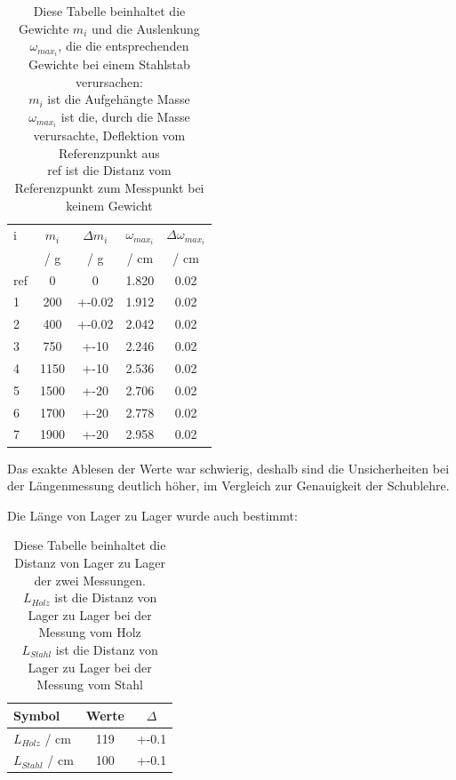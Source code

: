\documentclass[11pt,ngerman]{scrartcl}
\begin{document}
\begin{table}[H]
    \centering
    \caption{
        Diese Tabelle beinhaltet die Gewichte $m_i$ und die Auslenkung $\omega_{max_{i}}$,
        die die entsprechenden Gewichte bei einem Stahlstab verursachen:\\
        $m_{i}$ ist die Aufgehängte Masse \\
        $\omega_{max_{i}}$ ist die, durch die Masse verursachte, Deflektion vom Referenzpunkt aus \\
        ref ist die Distanz vom Referenzpunkt zum Messpunkt bei keinem Gewicht \\
    }
    \label{tab:messwerte_stahl}
    \begin{tabular}{l|S|S|S|S}
        i   & {$m_i$}     & {$\Delta m_i$} & $\omega_{max_{i}}$ & $\Delta \omega_{max_{i}}$ \\
        {}  & {/ \si{\g}} & {/ \si{\g}}    & {/ \si{\cm}}       & {/ \si{\cm}} \\ \hline \hline
        ref & 0    & 0      & 1.820 & 0.02\\
        1   & 200  & +-0.02 & 1.912 & 0.02\\
        2   & 400  & +-0.02 & 2.042 & 0.02\\
        3   & 750  & +-10   & 2.246 & 0.02\\
        4   & 1150 & +-10   & 2.536 & 0.02\\
        5   & 1500 & +-20   & 2.706 & 0.02\\
        6   & 1700 & +-20   & 2.778 & 0.02\\
        7   & 1900 & +-20   & 2.958 & 0.02\\
    \end{tabular}
\end{table}

Das exakte Ablesen der Werte war schwierig, deshalb sind die Unsicherheiten bei der Längenmessung
deutlich höher, im Vergleich zur Genauigkeit der Schublehre.


Die Länge von Lager zu Lager wurde auch bestimmt:

\begin{table}[H]
    \centering
    \caption{
        Diese Tabelle beinhaltet die Distanz von Lager zu Lager der
        zwei Messungen. \\
        $L_{Holz}$ ist die Distanz von Lager zu Lager bei der Messung vom Holz\\
        $L_{Stahl}$ ist die Distanz von Lager zu Lager bei der Messung vom Stahl\\
    }
    \label{tab:L}
    \begin{tabular}{l|S|S}
        Symbol                 & {Werte}     & {$\Delta$} \\ \hline \hline
        $L_{Holz}$ / \si{\cm}  & 119 & +-0.1\\ 
        $L_{Stahl}$ / \si{\cm} & 100 & +-0.1\\
    \end{tabular}
\end{table}
\end{document}
